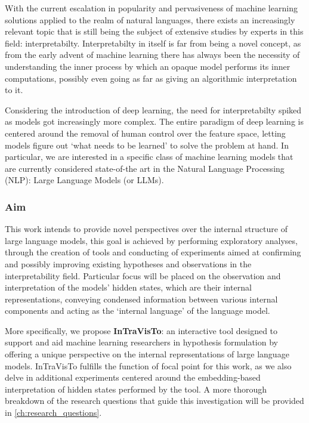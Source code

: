 With the current escalation in popularity and pervasiveness of machine learning solutions applied to the realm of natural languages, there exists an increasingly relevant topic that is still being the subject of extensive studies by experts in this field: interpretabilty.
Interpretabilty in itself is far from being a novel concept, as from the early advent of machine learning there has always been the necessity of understanding the inner process by which an opaque model performs its inner computations, possibly even going as far as giving an algorithmic interpretation to it. 

Considering the introduction of deep learning, the need for interpretabilty spiked as models got increasingly more complex.
The entire paradigm of deep learning is centered around the removal of human control over the feature space, letting models figure out `what needs to be learned' to solve the problem at hand.
In particular, we are interested in a specific class of machine learning models that are currently considered state-of-the art in the Natural Language Processing (NLP): Large Language Models (or LLMs).

\subsubsection*{Aim}

This work intends to provide novel perspectives over the internal structure of large language models, this goal is achieved by performing exploratory analyses, through the creation of tools and conducting of experiments aimed at confirming and possibly improving existing hypotheses and observations in the interpretability field.
Particular focus will be placed on the observation and interpretation of the models' hidden states, which are their internal representations, conveying condensed information between various internal components and acting as the `internal language' of the language model.

More specifically, we propose \textbf{InTraVisTo}: an interactive tool designed to support and aid machine learning researchers in hypothesis formulation by offering a unique perspective on the internal representations of large language models.
InTraVisTo fulfills the function of focal point for this work, as we also delve in additional experiments centered around the embedding-based interpretation of hidden states performed by the tool.
A more thorough breakdown of the research questions that guide this investigation will be provided in \cref{ch:research_questions}.

